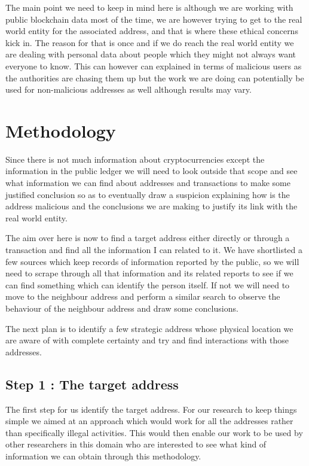 \documentclass{article}
\begin{document}
    The main point we need to keep in mind here is although we are working with public blockchain data most of the time, we are however trying to get to the real world entity for the associated address, and that is where these ethical concerns kick in. The reason for that is once and if we do reach the real world entity we are dealing with personal data about people which they might not always want everyone to know. This can however can explained in terms of malicious users as the authorities are chasing them up but the work we are doing can potentially be used for non-malicious addresses as well although results may vary.

\pagebreak

\section{Methodology}
 
    Since there is not much information about cryptocurrencies except the information in the public ledger we will need to look outside that scope and see what information we can find about addresses and transactions to make some justified conclusion so as to eventually draw a suspicion explaining how is the address malicious and the conclusions we are making to justify its link with the real world entity. 
    
    The aim over here is now to find a target address either directly or through a transaction and find all the information I can related to it. We have shortlisted a few sources which keep records of information reported by the public, so we will need to scrape through all that information and its related reports to see if we can find something which can identify the person itself. If not we will need to move to the neighbour address and perform a similar search to observe the behaviour of the neighbour address and draw some conclusions. 
    
    The next plan is to identify a few strategic address whose physical location we are aware of with complete certainty and try and find interactions with those addresses. 
    
    \subsection{Step 1 : The target address}
        The first step for us identify the target address. For our research to keep things simple we aimed at an approach which would work for all the addresses rather than specifically illegal activities. This would then enable our work to be used by other researchers in this domain who are interested to see what kind of information we can obtain through this methodology. 
        
\end{document}
